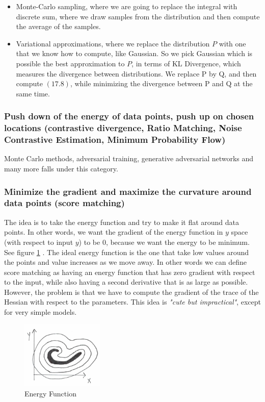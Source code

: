 \begin{itemize}
    \item Monte-Carlo sampling, where we are going to replace the integral with discrete sum, where we draw samples from the distribution and then compute the average of the samples.
    \item Variational approximations, where we replace the distribution $P$ with one that we know how to compute, like Gaussian. 
    So we pick Gaussian which is possible the best approximation to $P$, in terms of KL Divergence, which measures the divergence between distributions. 
    We replace P by Q, and then compute $(17.8)$, while minimizing the divergence between P and Q at the same time.
\end{itemize}

\subsubsection{Push down of the energy of data points, push up on chosen locations (contrastive divergence, Ratio Matching, Noise Contrastive Estimation, Minimum Probability Flow)}

Monte Carlo methods, adversarial training, generative adversarial networks and many more falls under this category.
 
\subsubsection{Minimize the gradient and maximize the curvature around data points (score matching)}

The idea is to take the energy function and try to make it flat around data points.
In other words, we want the gradient of the energy function in $y$ space (with respect to input $y$) to be $0$, because we want the energy to be minimum. 
See figure \ref{figure8} . 
The ideal energy function is the one that take low values around the points and value increases as we move away. 
In other words we can define score matching as having an energy function that has zero gradient with respect to the input, while also having a second derivative that is as large as possible. 
However, the problem is that we have to compute the gradient of the trace of the Hessian with respect to the parameters. 
This idea is \textit{"cute but impractical"}, except for very simple models. 

\begin{figure}[htb]
    \centering
    \includegraphics[width=0.35\textwidth]{lectures/10-b/image/pic8.png}
    \caption{Energy Function}
    \label{figure8}
\end{figure}

